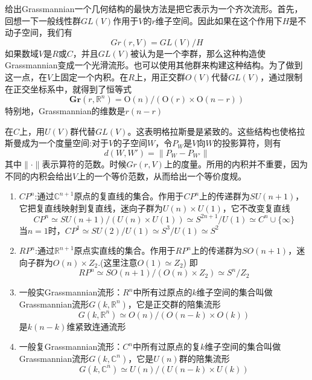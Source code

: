 \documentclass{article}
\numberwithin{equation}{subsection}
\begin{document}
给出Grassmannian一个几何结构的最快方法是把它表示为一个齐次流形。首先，回想一下一般线性群$GL(V)$作用于$V$的$r$维子空间。因此如果在这个作用下$H$是不动子空间，我们有
\begin{equation}
    Gr(r,V)=GL(V)/H
\end{equation}
如果数域$V$是$R$或$C$，并且$GL(V)$被认为是一个李群，那么这种构造使Grassmannian变成一个光滑流形。也可以使用其他群来构建这种结构。为了做到这一点，在$V$上固定一个内积。在$R$上，用正交群$O(V)$代替$GL(V)$，通过限制在正交坐标系中，就得到了恒等式
\begin{equation}
    \mathbf{G r}(r,\mathbb{R}^n)=\mathrm{O}(n) /(\mathrm{O}(r) \times \mathrm{O}(n-r))
\end{equation}
特别地，Grassmannian的维数是$r(n−r)$

在$C$上，用$U(V)$群代替$GL(V)$。这表明格拉斯曼是紧致的。这些结构也使格拉斯曼成为一个度量空间:对于$V$的子空间$W$，令$P_W$是$V$向$W$的投影算符，则有
\begin{equation}
    d(W,W')=\|P_W-P_{W'}\|
\end{equation}
其中$\|\cdot\|$表示算符的范数。时候$Gr(r,V)$上的度量。所用的内积并不重要，因为不同的内积会给出$V$上的一个等价范数，从而给出一个等价度规。

\begin{enumerate}
    \item $CP^n$:通过$\mathbb{C}^{n+1}$原点的复直线的集合。作用于$CP^n$上的传递群为$SU(n+1)$，它把复直线映射到复直线，迷向子群为$U(n)\times U(1)$，它不改变复直线
    \begin{equation}
        CP^n\simeq SU(n+1)/(U(n)\times U(1))\simeq S^{2n+1}/U(1)\simeq C^{n}\cup \{\infty\}
    \end{equation}
    当$n=1$时，$CP^1\simeq SU(2)/U(1)\simeq S^3/U(1)\simeq S^2$
    \item $RP^n$:通过$\mathbb{R}^{n+1}$原点实直线的集合。作用于$RP^n$上的传递群为$SO(n+1)$，迷向子群为$O(n)\times Z_2$.(这里注意$O(1)\simeq Z_2$) 即
    \begin{equation}
        RP^n\simeq SO(n+1)/(O(n)\times Z_2)\simeq S^n/Z_2
    \end{equation}
    \item 一般实Grassmannian流形：$R^n$中所有过原点的$k$维子空间的集合叫做Grassmannian流形$G(k,\mathbb{R}^n)$，它是正交群的陪集流形
    \begin{equation}
        G(k,\mathbb{R}^n) \simeq O(n) / (O(n-k) \times O(k))
    \end{equation}
    是$k(n-k)$维紧致连通流形
    \item 一般复Grassmannian流形：$C^n$中所有过原点的复$k$维子空间的集合叫做Grassmannian流形$G(k,\mathbb{C}^n)$，它是$U(n)$群的陪集流形
    \begin{equation}
        G(k,\mathbb{C}^n) \simeq U(n) / (U(n-k) \times U(k))
    \end{equation}
\end{enumerate}
\end{document}
